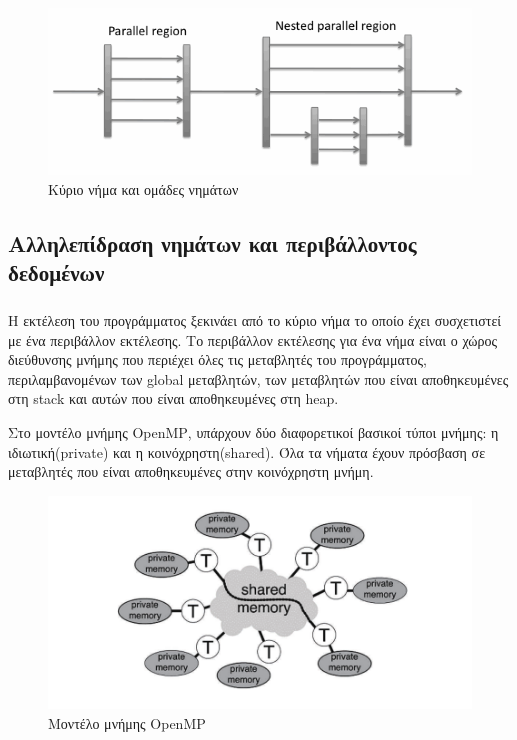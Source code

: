\documentclass[12pt]{article}
\newcommand{\en}[1]{\foreignlanguage{english}{#1}}
\begin{document}
\begin{figure}[h]
\includegraphics[width=\textwidth]{fork_join}
\captionsetup{justification=centering, singlelinecheck=false}
\caption{Κύριο νήμα και ομάδες νημάτων}
\label{fig:fork_join}
\end{figure}

\clearpage
\subsection{Αλληλεπίδραση νημάτων και περιβάλλοντος δεδομένων}
\subparagraph{}
Η εκτέλεση του προγράμματος ξεκινάει από το κύριο νήμα το οποίο έχει συσχετιστεί με ένα περιβάλλον εκτέλεσης. Το περιβάλλον εκτέλεσης για ένα νήμα είναι ο χώρος διεύθυνσης μνήμης που περιέχει όλες τις μεταβλητές του προγράμματος, περιλαμβανομένων των \en{global} μεταβλητών, των μεταβλητών που είναι αποθηκευμένες στη \en{stack} και αυτών που είναι αποθηκευμένες στη \en{heap}\cite{book2}. 

Στο μοντέλο μνήμης \en{OpenMP}, υπάρχουν δύο διαφορετικοί βασικοί τύποι μνήμης: η ιδιωτική(\en{private}) και η κοινόχρηστη(\en{shared}).  Όλα τα νήματα έχουν πρόσβαση σε μεταβλητές που είναι αποθηκευμένες στην κοινόχρηστη μνήμη\cite{thenextstep7}.

\begin{figure}[h]
\includegraphics[width=\textwidth]{private_shared}
\captionsetup{justification=centering, singlelinecheck=false}
\caption{Μοντέλο μνήμης \en{OpenMP}}
\label{fig:private_shared}
\end{figure}
\end{document}
